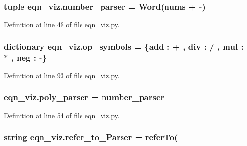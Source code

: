 \subsubsection[{number\+\_\+parser}]{\setlength{\rightskip}{0pt plus 5cm}tuple eqn\+\_\+viz.\+number\+\_\+parser = Word(nums + \textquotesingle{}-\/\textquotesingle{})}\label{namespaceeqn__viz_a5e65c3435a54324008033d990d858e72}


Definition at line 48 of file eqn\+\_\+viz.\+py.

\hypertarget{namespaceeqn__viz_a9377a4d68a694cfe5b8fd887d7d4f045}{}
\subsubsection[{op\+\_\+symbols}]{\setlength{\rightskip}{0pt plus 5cm}dictionary eqn\+\_\+viz.\+op\+\_\+symbols = \{\textquotesingle{}add\textquotesingle{} \+: \textquotesingle{}+\textquotesingle{} , \textquotesingle{}div\textquotesingle{} \+: \textquotesingle{}/\textquotesingle{} , \textquotesingle{}mul\textquotesingle{} \+: \textquotesingle{}$\ast$\textquotesingle{} , \textquotesingle{}neg\textquotesingle{} \+: \textquotesingle{}-\/\textquotesingle{}\}}\label{namespaceeqn__viz_a9377a4d68a694cfe5b8fd887d7d4f045}


Definition at line 93 of file eqn\+\_\+viz.\+py.

\hypertarget{namespaceeqn__viz_aa45f3f597ca3ecacab90d141137afe1c}{}
\subsubsection[{poly\+\_\+parser}]{\setlength{\rightskip}{0pt plus 5cm}eqn\+\_\+viz.\+poly\+\_\+parser = {\bf number\+\_\+parser}}\label{namespaceeqn__viz_aa45f3f597ca3ecacab90d141137afe1c}


Definition at line 54 of file eqn\+\_\+viz.\+py.

\hypertarget{namespaceeqn__viz_a28dbd804760bc7a217c14254976e5575}{}
\subsubsection[{refer\+\_\+to\+\_\+\+Parser}]{\setlength{\rightskip}{0pt plus 5cm}string eqn\+\_\+viz.\+refer\+\_\+to\+\_\+\+Parser = \textquotesingle{}refer\+To(\textquotesingle{}}\label{namespaceeqn__viz_a28dbd804760bc7a217c14254976e5575}


